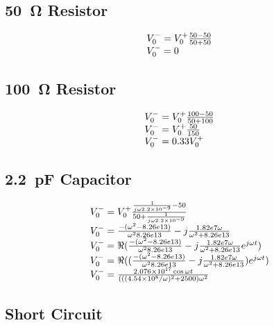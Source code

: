 \documentclass[conference]{IEEEtran}
\begin{document}
\subsection{\SI{50}{\ohm} Resistor}
\begin{equation}{\label{eq:v_reflected_50_ohms}}
  \begin{array}{ll}
    V_0^- = V_0^+ \frac{50 - 50}{50 + 50} \\
    V_0^- = 0\\
  \end{array}
\end{equation}

\subsection{\SI{100}{\ohm} Resistor}
\begin{equation}{\label{eq:v_reflected_100_ohms}}
  \begin{array}{ll}
    V_0^- = V_0^+ \frac{100 - 50}{50 + 100} \\
    V_0^- = V_0^+ \frac{50}{150} \\
    V_0^- = 0.33 V_0^+ \\
  \end{array}
\end{equation}

\subsection{\SI{2.2}{\pico\farad} Capacitor}
\begin{equation}{\label{eq:v_reflected_2_2_nF}}
  \begin{array}{ll}
    V_0^- = V_0^+ \frac{\frac{1}{j\omega\num{2.2e-9}} - 50}{50 +
      \frac{1}{j\omega\num{2.2e-9}}}\\
    V_0^- = \frac{-(\omega^2-8.26e13)}{\omega^2 8.26e13} -
    j\frac{1.82e7\omega}{\omega^2+8.26e13}\\
    V_0^- = \Re{(\frac{-(\omega^2-8.26e13)}{\omega^2 8.26e13} -
    j\frac{1.82e7\omega}{\omega^2+8.26e13} e^{j \omega t})} \\
  V_0^- = \Re{((\frac{-(\omega^2-8.26e13)}{\omega^2 8.26e13} -
    j\frac{1.82e7\omega}{\omega^2+8.26e13}) e^{j \omega t})} \\
  V_0^- = \frac{\num{2.076e17} \cos{\omega t}}{(((\num{4.54e8}/\omega)^2 + 2500) \omega^2}
  \end{array}
\end{equation}


\subsection{Short Circuit}
\end{document}
